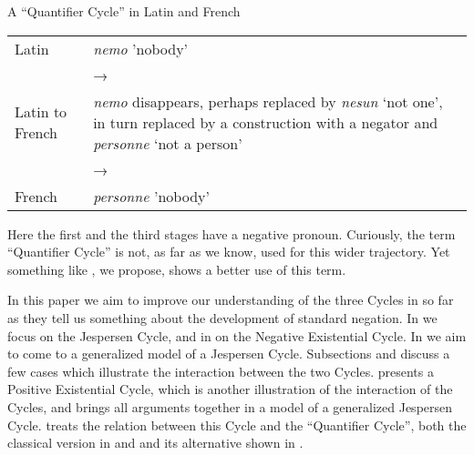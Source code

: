 ﻿\documentclass[output=paper]{langsci/langscibook}
\begin{document}
\begin{exe}\ex\label{ex:int-qc-latin}
A ``Quantifier Cycle'' in Latin and French\\[1ex]
%
\begin{tabularx}{.8\textwidth}{@{} l Q @{}}
Latin               &   \textit{nemo} 'nobody'\\
                    & → \\
Latin to French     &\textit{nemo} disappears,
  perhaps replaced by \textit{nesun} `not one', in turn replaced by a
  construction with a negator and \textit{personne} `not a
  person'\\
                    & →\\
French              & \textit{personne} 'nobody'
\end{tabularx}
\end{exe}

Here the first and the third stages have a negative pronoun. Curiously,
the term ``Quantifier Cycle'' is not, as far as we know, used for this
wider trajectory. Yet something like , we propose, shows a
better use of this term.

In this paper we aim to improve our understanding of the three Cycles in so
far as they tell us something about the development of standard negation.
In  we focus on the Jespersen Cycle, and in
 on the Negative Existential Cycle. In
 we aim to come to a generalized model of a Jespersen
Cycle. Subsections  and  discuss a few cases which illustrate the
interaction between the two Cycles.  presents a
Positive Existential Cycle, which is another illustration of the
interaction of the Cycles, and  brings all arguments
together in a model of a generalized Jespersen Cycle. 
treats the relation between this Cycle and the ``Quantifier Cycle'', both the
classical version in  and  and its alternative
shown in . %
\end{document}
